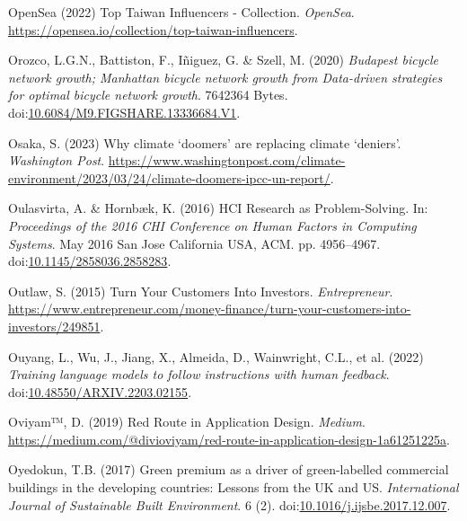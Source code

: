 \documentclass[
  letterpaper,
  DIV=11,
  numbers=noendperiod]{scrartcl}
\newlength{\cslhangindent}
\newenvironment{CSLReferences}[2] %
 {\begin{list}{}{%
  \setlength{\itemindent}{0pt}
  \setlength{\leftmargin}{0pt}
  \setlength{\parsep}{0pt}
  \ifodd #1
   \setlength{\leftmargin}{\cslhangindent}
   \setlength{\itemindent}{-1\cslhangindent}
  \fi
  \setlength{\itemsep}{#2\baselineskip}}}
 {\end{list}}
\begin{document}
\begin{CSLReferences}{0}{1}
OpenSea (2022) Top {Taiwan Influencers} - {Collection}. \emph{OpenSea}.
\url{https://opensea.io/collection/top-taiwan-influencers}.

Orozco, L.G.N., Battiston, F., Iñiguez, G. \& Szell, M. (2020)
\emph{Budapest bicycle network growth; {Manhattan} bicycle network
growth from {Data-driven} strategies for optimal bicycle network
growth}. 7642364 Bytes.
doi:\href{https://doi.org/10.6084/M9.FIGSHARE.13336684.V1}{10.6084/M9.FIGSHARE.13336684.V1}.

Osaka, S. (2023) Why climate {`doomers'} are replacing climate
{`deniers'}. \emph{Washington Post}.
\url{https://www.washingtonpost.com/climate-environment/2023/03/24/climate-doomers-ipcc-un-report/}.

Oulasvirta, A. \& Hornbæk, K. (2016) {HCI Research} as
{Problem-Solving}. In: \emph{Proceedings of the 2016 {CHI Conference} on
{Human Factors} in {Computing Systems}}. May 2016 San Jose California
USA, ACM. pp. 4956--4967.
doi:\href{https://doi.org/10.1145/2858036.2858283}{10.1145/2858036.2858283}.

Outlaw, S. (2015) Turn {Your Customers Into Investors}.
\emph{Entrepreneur}.
\url{https://www.entrepreneur.com/money-finance/turn-your-customers-into-investors/249851}.

Ouyang, L., Wu, J., Jiang, X., Almeida, D., Wainwright, C.L., et al.
(2022) \emph{Training language models to follow instructions with human
feedback}.
doi:\href{https://doi.org/10.48550/ARXIV.2203.02155}{10.48550/ARXIV.2203.02155}.

Oviyam™, D. (2019) Red {Route} in {Application Design}. \emph{Medium}.
\url{https://medium.com/@divioviyam/red-route-in-application-design-1a61251225a}.

Oyedokun, T.B. (2017) Green premium as a driver of green-labelled
commercial buildings in the developing countries: {Lessons} from the
{UK} and {US}. \emph{International Journal of Sustainable Built
Environment}. 6 (2).
doi:\href{https://doi.org/10.1016/j.ijsbe.2017.12.007}{10.1016/j.ijsbe.2017.12.007}.


\end{CSLReferences}
\end{document}
